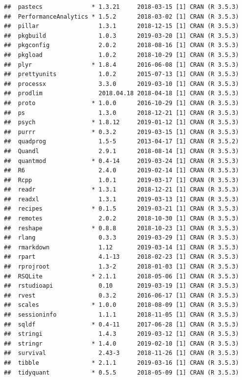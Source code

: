 \documentclass[12pt,openany]{book}
\begin{document}
\begin{verbatim}
##  pastecs              * 1.3.21     2018-03-15 [1] CRAN (R 3.5.3)
##  PerformanceAnalytics * 1.5.2      2018-03-02 [1] CRAN (R 3.5.3)
##  pillar                 1.3.1      2018-12-15 [1] CRAN (R 3.5.3)
##  pkgbuild               1.0.3      2019-03-20 [1] CRAN (R 3.5.3)
##  pkgconfig              2.0.2      2018-08-16 [1] CRAN (R 3.5.3)
##  pkgload                1.0.2      2018-10-29 [1] CRAN (R 3.5.3)
##  plyr                 * 1.8.4      2016-06-08 [1] CRAN (R 3.5.3)
##  prettyunits            1.0.2      2015-07-13 [1] CRAN (R 3.5.3)
##  processx               3.3.0      2019-03-10 [1] CRAN (R 3.5.3)
##  prodlim                2018.04.18 2018-04-18 [1] CRAN (R 3.5.3)
##  proto                * 1.0.0      2016-10-29 [1] CRAN (R 3.5.3)
##  ps                     1.3.0      2018-12-21 [1] CRAN (R 3.5.3)
##  psych                * 1.8.12     2019-01-12 [1] CRAN (R 3.5.3)
##  purrr                * 0.3.2      2019-03-15 [1] CRAN (R 3.5.3)
##  quadprog               1.5-5      2013-04-17 [1] CRAN (R 3.5.2)
##  Quandl                 2.9.1      2018-08-14 [1] CRAN (R 3.5.3)
##  quantmod             * 0.4-14     2019-03-24 [1] CRAN (R 3.5.3)
##  R6                     2.4.0      2019-02-14 [1] CRAN (R 3.5.3)
##  Rcpp                   1.0.1      2019-03-17 [1] CRAN (R 3.5.3)
##  readr                * 1.3.1      2018-12-21 [1] CRAN (R 3.5.3)
##  readxl                 1.3.1      2019-03-13 [1] CRAN (R 3.5.3)
##  recipes              * 0.1.5      2019-03-21 [1] CRAN (R 3.5.3)
##  remotes                2.0.2      2018-10-30 [1] CRAN (R 3.5.3)
##  reshape              * 0.8.8      2018-10-23 [1] CRAN (R 3.5.3)
##  rlang                  0.3.3      2019-03-29 [1] CRAN (R 3.5.3)
##  rmarkdown              1.12       2019-03-14 [1] CRAN (R 3.5.3)
##  rpart                  4.1-13     2018-02-23 [1] CRAN (R 3.5.3)
##  rprojroot              1.3-2      2018-01-03 [1] CRAN (R 3.5.3)
##  RSQLite              * 2.1.1      2018-05-06 [1] CRAN (R 3.5.3)
##  rstudioapi             0.10       2019-03-19 [1] CRAN (R 3.5.3)
##  rvest                  0.3.2      2016-06-17 [1] CRAN (R 3.5.3)
##  scales               * 1.0.0      2018-08-09 [1] CRAN (R 3.5.3)
##  sessioninfo            1.1.1      2018-11-05 [1] CRAN (R 3.5.3)
##  sqldf                * 0.4-11     2017-06-28 [1] CRAN (R 3.5.3)
##  stringi                1.4.3      2019-03-12 [1] CRAN (R 3.5.3)
##  stringr              * 1.4.0      2019-02-10 [1] CRAN (R 3.5.3)
##  survival               2.43-3     2018-11-26 [1] CRAN (R 3.5.3)
##  tibble               * 2.1.1      2019-03-16 [1] CRAN (R 3.5.3)
##  tidyquant            * 0.5.5      2018-05-09 [1] CRAN (R 3.5.3)

\end{verbatim}
\end{document}
